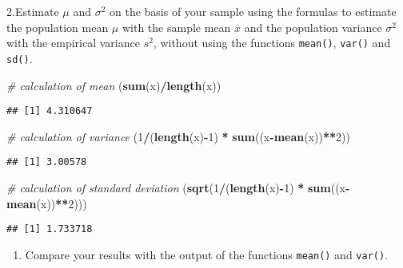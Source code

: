 \documentclass[
]{article}
\newenvironment{Shaded}{\begin{snugshade}}{\end{snugshade}}
\newcommand{\CommentTok}[1]{\textcolor[rgb]{0.56,0.35,0.01}{\textit{#1}}}
\newcommand{\DecValTok}[1]{\textcolor[rgb]{0.00,0.00,0.81}{#1}}
\newcommand{\KeywordTok}[1]{\textcolor[rgb]{0.13,0.29,0.53}{\textbf{#1}}}
\newcommand{\NormalTok}[1]{#1}
\newcommand{\OperatorTok}[1]{\textcolor[rgb]{0.81,0.36,0.00}{\textbf{#1}}}
\newcommand{\StringTok}[1]{\textcolor[rgb]{0.31,0.60,0.02}{#1}}
\providecommand{\tightlist}{%
  \setlength{\itemsep}{0pt}\setlength{\parskip}{0pt}}
\begin{document}
2.Estimate \(\mu\) and \(\sigma^{2}\) on the basis of your sample using
the formulas to estimate the population mean \(\mu\) with the sample
mean \(\overline{x}\) and the population variance \(\sigma^{2}\) with
the empirical variance \(s^2\), without using the functions
\texttt{mean()}, \texttt{var()} and \texttt{sd()}.

\begin{Shaded}
\begin{Highlighting}[]
\CommentTok{# calculation of mean}
\NormalTok{(}\KeywordTok{sum}\NormalTok{(x)}\OperatorTok{/}\KeywordTok{length}\NormalTok{(x))}
\end{Highlighting}
\end{Shaded}

\begin{verbatim}
## [1] 4.310647
\end{verbatim}

\begin{Shaded}
\begin{Highlighting}[]
\CommentTok{# calculation of variance}
\NormalTok{(}\DecValTok{1}\OperatorTok{/}\NormalTok{(}\KeywordTok{length}\NormalTok{(x)}\OperatorTok{-}\DecValTok{1}\NormalTok{) }\OperatorTok{*}\StringTok{ }\KeywordTok{sum}\NormalTok{((x}\OperatorTok{-}\KeywordTok{mean}\NormalTok{(x))}\OperatorTok{**}\DecValTok{2}\NormalTok{))}
\end{Highlighting}
\end{Shaded}

\begin{verbatim}
## [1] 3.00578
\end{verbatim}

\begin{Shaded}
\begin{Highlighting}[]
\CommentTok{# calculation of standard deviation}
\NormalTok{(}\KeywordTok{sqrt}\NormalTok{(}\DecValTok{1}\OperatorTok{/}\NormalTok{(}\KeywordTok{length}\NormalTok{(x)}\OperatorTok{-}\DecValTok{1}\NormalTok{) }\OperatorTok{*}\StringTok{ }\KeywordTok{sum}\NormalTok{((x}\OperatorTok{-}\KeywordTok{mean}\NormalTok{(x))}\OperatorTok{**}\DecValTok{2}\NormalTok{)))}
\end{Highlighting}
\end{Shaded}

\begin{verbatim}
## [1] 1.733718
\end{verbatim}

\begin{enumerate}
\def\labelenumi{\arabic{enumi}.}
\setcounter{enumi}{2}
\tightlist
\item
  Compare your results with the output of the functions \texttt{mean()}
  and \texttt{var()}.
\end{enumerate}
\end{document}
